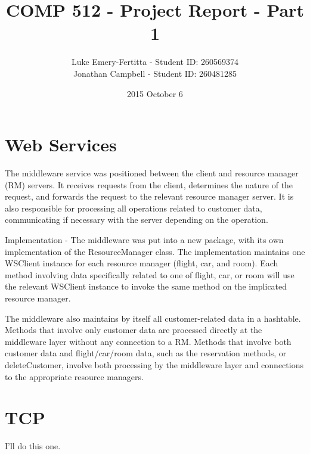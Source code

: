 \documentclass[11pt]{article}
\begin{document}
\title{COMP 512 - Project Report - Part 1}
\author{Luke Emery-Fertitta - Student ID: 260569374 \\ Jonathan Campbell - Student ID: 260481285}
\date{2015 October 6}
\maketitle

\section{Web Services}

The middleware service was positioned between the client and resource manager (RM) servers. It receives requests from the client, determines the nature of the request, and forwards the request to the relevant resource manager server. It is also responsible for processing all operations related to customer data, communicating if necessary with the server depending on the operation.

Implementation - The middleware was put into a new package, with its own implementation of the ResourceManager class. The implementation maintains one WSClient instance for each resource manager (flight, car, and room). Each method involving data specifically related to one of flight, car, or room will use the relevant WSClient instance to invoke the same method on the implicated resource manager.

The middleware also maintains by itself all customer-related data in a hashtable. Methods that involve only customer data are processed directly at the middleware layer without any connection to a RM. Methods that involve both customer data and flight/car/room data, such as the reservation methods, or deleteCustomer, involve both processing by the middleware layer and connections to the appropriate resource managers.

\section{TCP}

I'll do this one. \par
\end{document}
